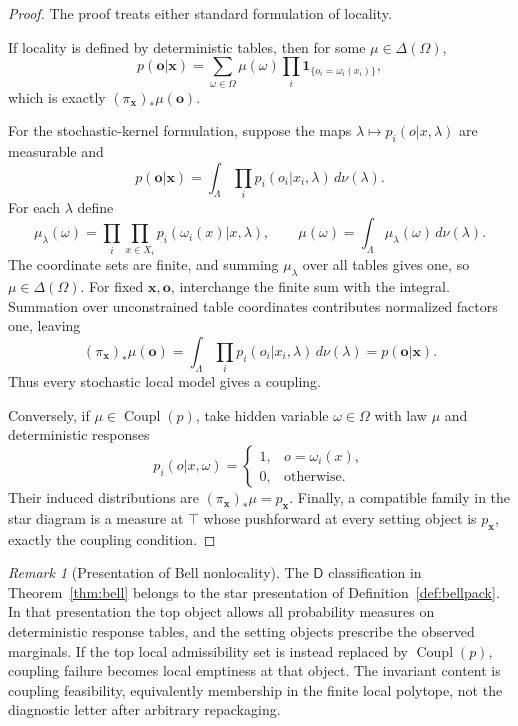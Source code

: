 \documentclass[11pt]{article}
\theoremstyle{plain}
\theoremstyle{definition}
\theoremstyle{remark}
\newtheorem{remark}[theorem]{Remark}
\begin{document}
\begin{proof}
The proof treats either standard formulation of locality.

If locality is defined by deterministic tables, then for some
$\mu\in\Delta(\Omega)$,
\[
p(\mathbf o|\mathbf x)=
\sum_{\omega\in\Omega}\mu(\omega)
\prod_i\mathbf 1_{\{o_i=\omega_i(x_i)\}},
\]
which is exactly $(\pi_{\mathbf x})_*\mu(\mathbf o)$.

For the stochastic-kernel formulation, suppose the maps
$\lambda\mapsto p_i(o|x,\lambda)$ are measurable and
\[
p(\mathbf o|\mathbf x)=
\int_\Lambda\prod_i p_i(o_i|x_i,\lambda)\,d\nu(\lambda).
\]
For each $\lambda$ define
\[
\mu_\lambda(\omega)=
\prod_i\prod_{x\in X_i}p_i(\omega_i(x)|x,\lambda),
\qquad
\mu(\omega)=\int_\Lambda\mu_\lambda(\omega)\,d\nu(\lambda).
\]
The coordinate sets are finite, and summing $\mu_\lambda$ over all tables gives
one, so $\mu\in\Delta(\Omega)$. For fixed $\mathbf x,\mathbf o$, interchange
the finite sum with the integral. Summation over unconstrained table coordinates
contributes normalized factors one, leaving
\[
(\pi_{\mathbf x})_*\mu(\mathbf o)
=\int_\Lambda\prod_i p_i(o_i|x_i,\lambda)\,d\nu(\lambda)
=p(\mathbf o|\mathbf x).
\]
Thus every stochastic local model gives a coupling.

Conversely, if $\mu\in\operatorname{Coupl}(p)$, take hidden variable
$\omega\in\Omega$ with law $\mu$ and deterministic responses
\[
p_i(o|x,\omega)=
\begin{cases}1,&o=\omega_i(x),\\0,&\text{otherwise}.
\end{cases}
\]
Their induced distributions are $(\pi_{\mathbf x})_*\mu=p_{\mathbf x}$.
Finally, a compatible family in the star diagram is a measure at $\top$ whose
pushforward at every setting object is $p_{\mathbf x}$, exactly the coupling
condition.
\end{proof}

\begin{remark}[Presentation of Bell nonlocality]
The $\mathsf D$ classification in Theorem~\ref{thm:bell} belongs to the star
presentation of Definition~\ref{def:bellpack}. In that presentation the top
object allows all probability measures on deterministic response tables, and the
setting objects prescribe the observed marginals. If the top local admissibility
set is instead replaced by $\operatorname{Coupl}(p)$, coupling failure becomes
local emptiness at that object. The invariant content is coupling feasibility,
equivalently membership in the finite local polytope, not the diagnostic letter
after arbitrary repackaging.
\end{remark}
\end{document}
